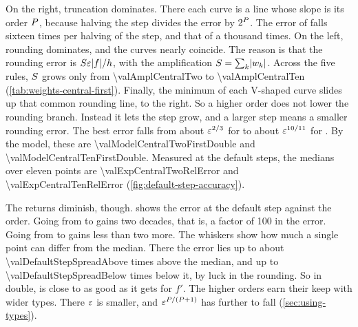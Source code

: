 On the right, truncation dominates. There each curve is a line whose slope is its order $\aorder$, because halving
the step divides the error by $2^{P}$. The error of  falls sixteen times per halving of the
step, and that of  a thousand times. On the left, rounding dominates, and the curves nearly
coincide. The reason is that the rounding error is $S \varepsilon \lvert f \rvert / h$, with the amplification
$S = \sum_k \lvert w_k \rvert$. Across the five rules, $S$ grows only from \num{\valAmplCentralTwo} to
\num{\valAmplCentralTen} (\cref{tab:weights-central-first}). Finally, the minimum of each V-shaped curve slides up
that common rounding line, to the right. So a higher order does not lower the rounding branch. Instead it lets the
step grow, and a larger step means a smaller rounding error. The best error falls from about $\varepsilon^{2/3}$ for
 to about $\varepsilon^{10/11}$ for . By the model, these are
\num{\valModelCentralTwoFirstDouble} and \num{\valModelCentralTenFirstDouble}. Measured at the default steps, the
medians over eleven points are \num{\valExpCentralTwoRelError} and \num{\valExpCentralTenRelError}
(\cref{fig:default-step-accuracy}).

\begin{marginfigure}
\centering

\caption{The relative error at the default step against $\aorder$, for  and  on
$\mathrm{e}^x$. Each mark is the median over eleven points in $[0.5, 1]$; the whiskers show the smallest and the
largest value. For double, the returns diminish beyond 4 or 6.\label{fig:default-step-accuracy}}
\end{marginfigure}

The returns diminish, though.  shows the error at the default step against the
order. Going from  to  gains two decades, that is, a factor of 100 in the error.
Going from  to  gains less than two more. The whiskers show how much a single
point can differ from the median. There the error lies up to about \num{\valDefaultStepSpreadAbove} times above the
median, and up to \num{\valDefaultStepSpreadBelow} times below it, by luck in the rounding. So in double,
 is close to as good as it gets for $f'$. The higher orders earn their keep with wider types. There
$\varepsilon$ is smaller, and $\varepsilon^{P/(P+1)}$ has further to fall (\cref{sec:using-types}).

